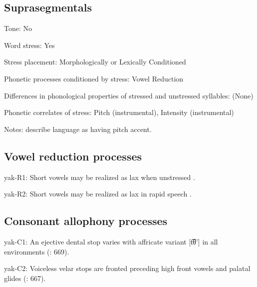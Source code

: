 {\subsection*{Suprasegmentals}
\begin{appendixdesc}
\item[Tone:] No

\item[Word stress:] Yes

\item[Stress placement:] Morphologically or Lexically Conditioned

\item[Phonetic processes conditioned by stress:] Vowel Reduction

\item[Differences in phonological properties of stressed and unstressed syllables:] (None)

\item[Phonetic correlates of stress:] Pitch (instrumental), Intensity (instrumental)

\item[Notes:] \citet{HargusBeavert2005} describe language as having pitch accent.
\end{appendixdesc}
\subsection*{Vowel reduction processes}
\begin{appendixdesc}

\item[yak-R1:] Short vowels may be realized as lax when unstressed \citep[40]{Jansen2010}.

\item[yak-R2:] Short vowels may be realized as lax in rapid speech \citep[40]{Jansen2010}.
\end{appendixdesc}
\subsection*{Consonant allophony processes}
\begin{appendixdesc}

\item[yak-C1:] An ejective dental stop varies with affricate variant [t͡θ’] in all environments (\citealt{RigsbyRude1996}: 669).

\item[yak-C2:] Voiceless velar stops are fronted preceding high front vowels and palatal glides (\citealt{RigsbyRude1996}: 667).
\end{appendixdesc}
}
